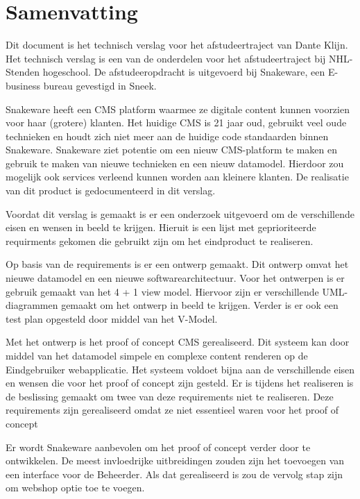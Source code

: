 \chapter*{Samenvatting}
Dit document is het technisch verslag voor het afstudeertraject van Dante Klijn.
Het technisch verslag is een van de onderdelen voor het afstudeertraject bij NHL-Stenden hogeschool.
De afstudeeropdracht is uitgevoerd bij Snakeware, een E-business bureau gevestigd in Sneek.

\whitespace
Snakeware heeft een \gls{CMS} platform waarmee ze digitale content kunnen voorzien voor haar (grotere) klanten.
Het huidige \gls{CMS} is 21 jaar oud, gebruikt veel oude technieken en houdt zich niet meer aan de huidige code standaarden binnen Snakeware.
Snakeware ziet potentie om een nieuw \gls{CMS}-platform te maken en gebruik te maken van nieuwe technieken en een nieuw datamodel.
Hierdoor zou mogelijk ook services verleend kunnen worden aan kleinere klanten.
De realisatie van dit product is gedocumenteerd in dit verslag.

\whitespace
Voordat dit verslag is gemaakt is er een onderzoek uitgevoerd om de verschillende eisen en wensen in beeld te krijgen.
Hieruit is een lijst met geprioriteerde requirments gekomen die gebruikt zijn om het eindproduct te realiseren.

\whitespace
Op basis van de requirements is er een ontwerp gemaakt.
Dit ontwerp omvat het nieuwe datamodel en een nieuwe softwarearchitectuur.
Voor het ontwerpen is er gebruik gemaakt van het 4 + 1 view model.
Hiervoor zijn er verschillende UML-diagrammen gemaakt om het ontwerp in beeld te krijgen.
Verder is er ook een test plan opgesteld door middel van het V-Model.

\whitespace
Met het ontwerp is het proof of concept \gls{CMS} gerealiseerd.
Dit systeem kan door middel van het datamodel simpele en complexe content renderen op de \gls{Eindgebruiker} webapplicatie.
Het systeem voldoet bijna aan de verschillende eisen en wensen die voor het proof of concept zijn gesteld. 
Er is tijdens het realiseren is de beslissing gemaakt om twee van deze requirements niet te realiseren.
Deze requirements zijn gerealiseerd omdat ze niet essentieel waren voor het proof of concept

\whitespace
Er wordt Snakeware aanbevolen om het proof of concept verder door te ontwikkelen.
De meest invloedrijke uitbreidingen zouden zijn het toevoegen van een interface voor de \gls{Beheerder}.
Als dat gerealiseerd is zou de vervolg stap zijn om webshop optie toe te voegen.
